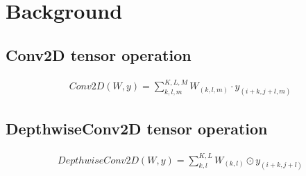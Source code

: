 \section{Background}
\label{sec:background}
\subsection{Conv2D tensor operation}

 	\begin{eqnarray} \label{eq:Conv2D}
 	Conv2D\left(W,y\right)=\sum_{k,l,m}^{K,L,M}W_{(k,l,m)} \cdot y_{(i+k,j+l,m)}
 	\end{eqnarray} 	
 	
\subsection{DepthwiseConv2D tensor operation}

 	\begin{eqnarray} \label{eq:DepthwiseConv2D}
 	DepthwiseConv2D\left(W,y\right)=\sum_{k,l}^{K,L}W_{(k,l)} \odot y_{(i+k,j+l)}
 	\end{eqnarray}